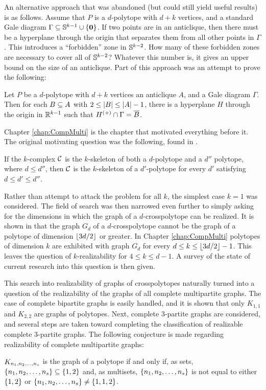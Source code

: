 An alternative approach that was abandoned (but could still yield useful results) is as follows.  Assume that \(P\) is a \(d\)-polytope with \(d+k\) vertices, and a standard Gale diagram \(\Gamma\subseteq\mathbb{S}^{k-1}\cup\left\{\bm{0}\right\}\).  If two points are in an anticlique, then there must be a hyperplane through the origin that separates them from all other points in \(\Gamma\).  This introduces a ``forbidden'' zone in \(\mathbb{S}^{k-2}\).  How many of these forbidden zones are necessary to cover all of \(\mathbb{S}^{k-2}\)?  Whatever this number is, it gives an upper bound on the size of an anticlique.  Part of this approach was an attempt to prove the following:
    \begin{Conjecture}
        Let \(P\) be a \(d\)-polytope with \(d+k\) vertices an anticlique \(A\), and a Gale diagram \(\Gamma\).  Then for each \(B\subseteq A\) with \(2\le\left\lvert B\right\rvert\le\left\lvert A\right\rvert-1\), there is a hyperplane \(H\) through the origin in \(\mathbb{R}^{k-1}\) such that \(H^{(+)}\cap\Gamma=\overline{B}\).
    \end{Conjecture}

Chapter \ref{chap:CompMulti} is the chapter that motivated everything before it.  The original motivating question was the following, found in \cite{GrunBook}.
    \begin{Conjecture}[Gr\"unbaum]
        If the \(k\)-complex \(\mathcal{C}\) is the \(k\)-skeleton of both a \(d\)-polytope and a \(d''\) polytope, where \(d\le d''\), then \(\mathcal{C}\) is the \(k\)-skeleton of a \(d'\)-polytope for every \(d'\) satisfying \(d\le d'\le d''\).
    \end{Conjecture}
Rather than attempt to attack the problem for all \(k\), the simplest case \(k=1\) was considered.  The field of search was then narrowed even further to simply asking for the dimensions in which the graph of a \(d\)-crosspolytope can be realized.  It is shown in \cite{Halin} that the graph \(G_d\) of a \(d\)-crosspolytope cannot be the graph of a polytope of dimension \(\left\lfloor3d/2\right\rfloor\) or greater. In Chapter \ref{chap:CompMulti} polytopes of dimension \(k\) are exhibited with graph \(G_d\) for every \(d\le k\le\left\lfloor3d/2\right\rfloor-1\).  This leaves the question of \(k\)-realizability for \(4\le k\le d-1\).  A survey of the state of current research into this question is then given.

This search into realizability of graphs of crosspolytopes naturally turned into a question of the realizability of the graphs of all complete multipartite graphs.  The case of complete bipartite graphs is easily handled, and it is shown that only \(K_{1,1}\) and \(K_{2,2}\) are graphs of polytopes.  Next, complete \(3\)-partite graphs are considered, and several steps are taken toward completing the classification of realizable complete \(3\)-partite graphs.  The following conjecture is made regarding realizability of complete multipartite graphs:
    \begin{Conjecture}
        \(K_{n_1,n_2,\dotsc, n_s}\) is the graph of a polytope if and only if, as sets, \(\left\{n_1,n_2,\dotsc, n_s\right\}\subseteq\left\{1,2\right\}\) and, as multisets, \(\left\{n_1,n_2,\dotsc, n_s\right\}\) is not equal to either \(\left\{1,2\right\}\) or \(\left\{n_1,n_2,\dotsc, n_s\right\}\ne\left\{1,1,2\right\}\).
    \end{Conjecture}


\begin{comment}
\begin{Question}[Kalai?]
    Does the graph of a centrally symmetric \(d\)-polytope always contain a \(G_d\) minor?
\end{Question}
\end{comment} 